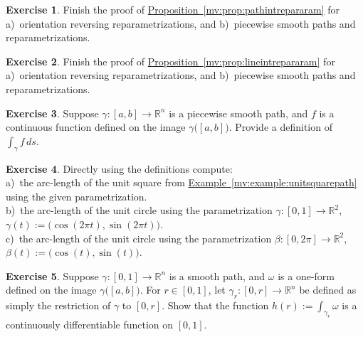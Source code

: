 \documentclass[12pt]{book}
\newcommand{\R}{{\mathbb{R}}}
\theoremstyle{plain}
\theoremstyle{remark}
\theoremstyle{definition}
\theoremstyle{exercise}
\newtheorem{exercise}{Exercise}[section]
\theoremstyle{example}
\newcommand{\exampleref}[1]{\hyperref[#1]{Example~\ref*{#1}}}
\newcommand{\propref}[1]{\hyperref[#1]{Proposition~\ref*{#1}}}
\begin{document}

\begin{exercise} \label{mv:exercise:pathpiece}
Finish the proof of \propref{mv:prop:pathintrepararam}
for a)~orientation reversing reparametrizations, and b)~piecewise smooth paths
and reparametrizations.
\end{exercise}

\begin{exercise} \label{mv:exercise:linepiece}
Finish the proof of \propref{mv:prop:lineintrepararam}
for a)~orientation reversing reparametrizations, and b)~piecewise smooth paths
and reparametrizations.
\end{exercise}

\begin{exercise}
Suppose $\gamma \colon [a,b] \to \R^n$ is a piecewise smooth path, and $f$ is a
continuous function defined on the image $\gamma\bigl([a,b]\bigr)$.
Provide a definition of $\int_{\gamma} f \,ds$.
\end{exercise}

\begin{exercise}
Directly using the definitions compute:\\
a)~the arc-length of the unit square from
\exampleref{mv:example:unitsquarepath} using the given parametrization.
\\
b)~the arc-length of the unit circle using the parametrization
$\gamma \colon [0,1] \to \R^2$, $\gamma(t) := \bigl(\cos(2\pi t),\sin(2\pi t)\bigr)$.
\\
c)~the arc-length of the unit circle using the parametrization
$\beta \colon [0,2\pi] \to \R^2$, $\beta(t) := \bigl(\cos(t),\sin(t)\bigr)$.
\end{exercise}

\begin{exercise}
Suppose $\gamma \colon [0,1] \to \R^n$ is a smooth path, and
$\omega$ is a one-form defined on the image $\gamma\bigl([a,b]\bigr)$.
For $r \in [0,1]$, let $\gamma_r \colon [0,r] \to \R^n$ be defined
as simply the restriction of $\gamma$ to $[0,r]$.  Show that the
function $h(r) := \int_{\gamma_r} \omega$ is a continuously
differentiable function on $[0,1]$.
\end{exercise}
\end{document}
